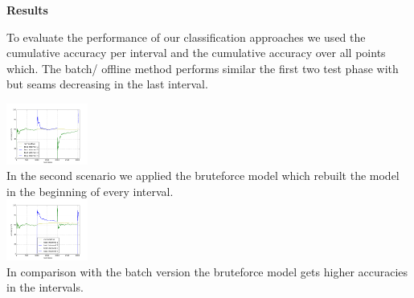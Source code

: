 \begin{center} \textbf{\huge Results} \end{center}
To evaluate the performance of our classification approaches we used the cumulative accuracy per interval and the cumulative accuracy over all points which. The batch/ offline method performs similar the first two test phase with but seams decreasing in the last interval.

 \includegraphics[width=0.2\textwidth]{./plots/batchPlot.png}\\
In the second scenario we applied the bruteforce model which rebuilt the model in the beginning of every interval.\\
   \includegraphics[width=0.2\textwidth]{./plots/bruteforce2_Plot.png}\\
In comparison with the batch version the bruteforce model gets higher accuracies in the intervals.\\

